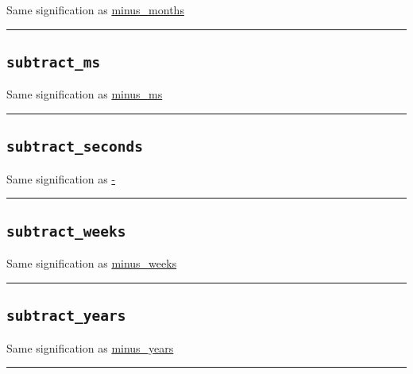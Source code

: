 \documentclass[]{book}
\theoremstyle{definition}
\theoremstyle{definition}
\theoremstyle{definition}
\theoremstyle{remark}
\begin{document}
Same signification as
\href{operators-i-to-m.html\#minus_months}{minus\_months}

\begin{center}\rule{0.5\linewidth}{\linethickness}\end{center}

\subsection{\texorpdfstring{\texttt{subtract\_ms}}{subtract\_ms}}\label{subtract_ms}

Same signification as \href{operators-i-to-m.html\#minus_ms}{minus\_ms}

\begin{center}\rule{0.5\linewidth}{\linethickness}\end{center}

\subsection{\texorpdfstring{\texttt{subtract\_seconds}}{subtract\_seconds}}\label{subtract_seconds}

Same signification as \href{operators-a-to-a.html\#-}{-}

\begin{center}\rule{0.5\linewidth}{\linethickness}\end{center}

\subsection{\texorpdfstring{\texttt{subtract\_weeks}}{subtract\_weeks}}\label{subtract_weeks}

Same signification as
\href{operators-i-to-m.html\#minus_weeks}{minus\_weeks}

\begin{center}\rule{0.5\linewidth}{\linethickness}\end{center}

\subsection{\texorpdfstring{\texttt{subtract\_years}}{subtract\_years}}\label{subtract_years}

Same signification as
\href{operators-i-to-m.html\#minus_years}{minus\_years}

\begin{center}\rule{0.5\linewidth}{\linethickness}\end{center}
\end{document}
